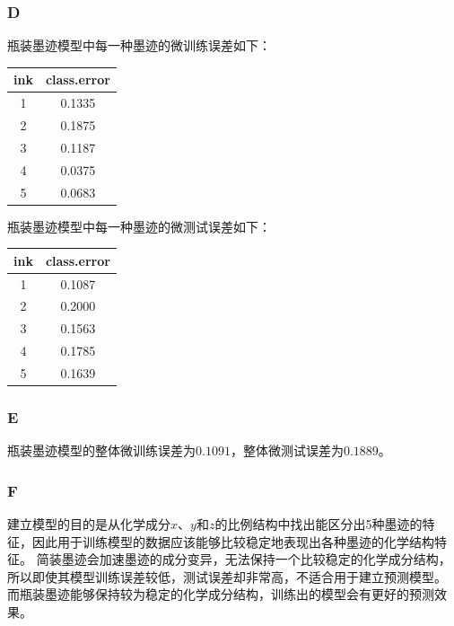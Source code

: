 \documentclass[12pt,a4paper]{article}
\begin{document}
    \subsubsection*{D}
    瓶装墨迹模型中每一种墨迹的微训练误差如下：
    \begin{longtable}{c|c}
        \hline
        \textbf{ink} & \textbf{class.error}\\
        \hline
        1 & 0.1335\\
        2 & 0.1875\\
        3 & 0.1187\\
        4 & 0.0375\\
        5 & 0.0683\\
        \hline
    \end{longtable}
    瓶装墨迹模型中每一种墨迹的微测试误差如下：
    \begin{longtable}{c|c}
        \hline
        \textbf{ink} & \textbf{class.error}\\
        \hline
        1 & 0.1087\\
        2 & 0.2000\\
        3 & 0.1563\\
        4 & 0.1785\\
        5 & 0.1639\\
        \hline
    \end{longtable}
    \subsubsection*{E}
    瓶装墨迹模型的整体微训练误差为$0.1091$，整体微测试误差为$0.1889$。
    \subsubsection*{F}
    建立模型的目的是从化学成分$x$、$y$和$z$的比例结构中找出能区分出5种墨迹的特征，因此用于训练模型的数据应该能够比较稳定地表现出各种墨迹的化学结构特征。
    简装墨迹会加速墨迹的成分变异，无法保持一个比较稳定的化学成分结构，所以即使其模型训练误差较低，测试误差却非常高，不适合用于建立预测模型。
    而瓶装墨迹能够保持较为稳定的化学成分结构，训练出的模型会有更好的预测效果。
\end{document}
